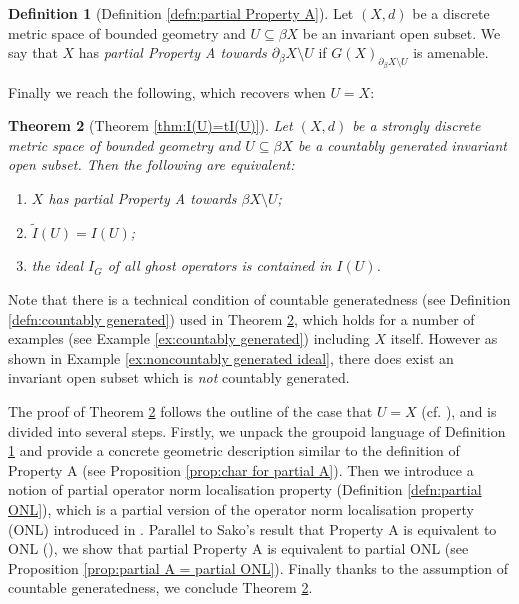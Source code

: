 \documentclass[12pt, a4paper]{amsart}
\numberwithin{equation}{section}
\newtheorem{alphthm}{Theorem}			%
\theoremstyle{definition}
\newtheorem{alphdefn}[alphthm]{Definition}			%
\theoremstyle{remark}
\begin{document}
\begin{alphdefn}[Definition \ref{defn:partial Property A}]\label{introdefn:partial A}
Let $(X,d)$ be a discrete metric space of bounded geometry and $U \subseteq \beta X$ be an invariant open subset. We say that $X$ has \emph{partial Property A towards $\partial_\beta X \setminus U$} if $G(X)_{\partial_\beta X \setminus U}$ is amenable.
\end{alphdefn}

Finally we reach the following, which recovers \cite[Theorem 1.3]{RW14} when $U=X$:

\begin{alphthm}[Theorem \ref{thm:I(U)=tI(U)}]\label{introthm:I(U)=tI(U)}
Let $(X,d)$ be a strongly discrete metric space of bounded geometry and $U \subseteq \beta X$ be a countably generated invariant open subset.
Then the following are equivalent:
\begin{enumerate}
 \item $X$ has partial Property A towards $\beta X \setminus U$;
 \item $\tilde{I}(U) = I(U)$;
 \item the ideal $I_G$ of all ghost operators is contained in $I(U)$.
\end{enumerate}
\end{alphthm}


Note that there is a technical condition of countable generatedness (see Definition \ref{defn:countably generated}) used in Theorem \ref{introthm:I(U)=tI(U)}, which holds for a number of examples (see Example \ref{ex:countably generated}) including $X$ itself. However as shown in Example \ref{ex:noncountably generated ideal}, there does exist an invariant open subset which is \emph{not} countably generated. 

The proof of Theorem \ref{introthm:I(U)=tI(U)} follows the outline of the case that $U=X$ (cf. \cite[Theorem 1.3]{RW14}), and is divided into several steps. Firstly, we unpack the groupoid language of Definition \ref{introdefn:partial A} and provide a concrete geometric description similar to the definition of Property A (see Proposition \ref{prop:char for partial A}). Then we introduce a notion of partial operator norm localisation property (Definition \ref{defn:partial ONL}), which is a partial version of the operator norm localisation property (ONL) introduced in \cite{CTWY08}. Parallel to Sako's result that Property A is equivalent to ONL (\cite{Sak14}), we show that partial Property A is equivalent to partial ONL (see Proposition \ref{prop:partial A = partial ONL}). Finally thanks to the assumption of countable generatedness, we conclude Theorem \ref{introthm:I(U)=tI(U)}. 
\end{document}
